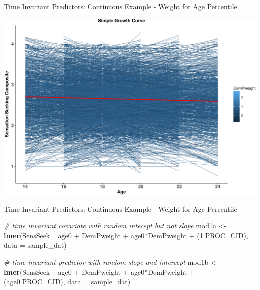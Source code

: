\documentclass[ignorenonframetext,]{beamer}
\newenvironment{Shaded}{\begin{snugshade}}{\end{snugshade}}
\newcommand{\KeywordTok}[1]{\textcolor[rgb]{0.13,0.29,0.53}{\textbf{{#1}}}}
\newcommand{\DataTypeTok}[1]{\textcolor[rgb]{0.13,0.29,0.53}{{#1}}}
\newcommand{\DecValTok}[1]{\textcolor[rgb]{0.00,0.00,0.81}{{#1}}}
\newcommand{\StringTok}[1]{\textcolor[rgb]{0.31,0.60,0.02}{{#1}}}
\newcommand{\CommentTok}[1]{\textcolor[rgb]{0.56,0.35,0.01}{\textit{{#1}}}}
\newcommand{\NormalTok}[1]{{#1}}
\begin{document}
\begin{frame}{Time Invariant Predictors: Continuous Example - Weight for
Age Percentile}

\includegraphics{Conditional_Models_files/figure-beamer/unnamed-chunk-8-1.pdf}

\end{frame}

\begin{frame}[fragile]{Time Invariant Predictors: Continuous Example -
Weight for Age Percentile}

\tiny

\begin{Shaded}
\begin{Highlighting}[]
\CommentTok{# time invariant covariate with random intecept but not slope}
\NormalTok{mod1a <-}\StringTok{ }\KeywordTok{lmer}\NormalTok{(SensSeek ~}\StringTok{ }\NormalTok{age0 +}\StringTok{ }\NormalTok{DemPweight +}\StringTok{ }\NormalTok{age0*DemPweight +}\StringTok{ }\NormalTok{(}\DecValTok{1}\NormalTok{|PROC_CID), }
              \DataTypeTok{data =} \NormalTok{sample_dat)}

\CommentTok{# time invariant predictor with random slope and intercept}
\NormalTok{mod1b <-}\StringTok{ }\KeywordTok{lmer}\NormalTok{(SensSeek ~}\StringTok{ }\NormalTok{age0 +}\StringTok{ }\NormalTok{DemPweight +}\StringTok{ }\NormalTok{age0*DemPweight +}\StringTok{ }
\StringTok{                }\NormalTok{(age0|PROC_CID), }\DataTypeTok{data =} \NormalTok{sample_dat)}
\end{Highlighting}
\end{Shaded}

\normalsize

\end{frame}
\end{document}
